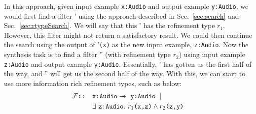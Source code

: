In this approach, given input example \texttt{x:Audio} and output example \texttt{y:Audio}, we would first find a filter \synthFilter' using the approach described in Sec.~\ref{sec:search} and Sec.~\ref{sec:rtypeSearch}.
We will say that this \synthFilter' has the refinement type $r_1$.
However, this filter might not return a satisfactory result.
We could then continue the search using the output of \synthFilter'\texttt{(x)} as the new input example, \texttt{z:Audio}.
Now the synthesis task is to find a filter \synthFilter'' (with refinement type $r_2$) using input example \texttt{z:Audio} and output example \texttt{y:Audio}.
Essentially, \synthFilter' has gotten us the first half of the way, and \synthFilter'' will get us the second half of the way.
With this, we can start to use more information rich refinement types, such as below:
%
\begin{align*}
\synthFilter \texttt{:: } & \texttt{x:Audio} \to\ \texttt{y:Audio}\ \mid \\
   & \exists \ \texttt{z:Audio}.\ r_1\texttt{(x,z)} \land r_2\texttt{(z,y)}
\end{align*}

